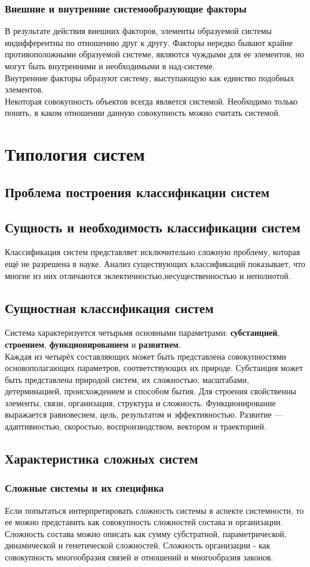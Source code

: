 \documentclass{article}
\newcommand{\important}[1]{\textbf{#1}}
\begin{document}
\subsubsection*{Внешние и внутренние системообразующие факторы}
В результате действия внешних факторов, элементы образуемой системы индифферентны по отношению друг к другу. Факторы нередко бывают крайне противоположными образуемой системе, являются чуждыми для ее элементов, но могут быть внутренними и необходимыми в над-системе.
\\
Внутренние факторы образуют систему, выступающую как единство подобных элементов.
\\
Некоторая совокупность объектов всегда является системой. Необходимо только понять, в каком отношении данную совокупность можно считать системой.
\section{Типология систем}
\subsection{Проблема построения классификации систем}
\subsection*{Сущность и необходимость классификации систем}
Классификация систем представляет исключительно сложную проблему, которая ещё не разрешена в науке. Анализ существующих классификаций показывает, что многие из них отличаются эклектичностью,несущественностью и неполнотой.
\subsection*{Сущностная классификация систем}
Система характеризуется четырьмя основными параметрами: \important{субстанцией}, \important{строением}, \important{функционированием} и \important{развитием}.
\\
Каждая из четырёх составляющих может быть представлена совокупностями основополагающих параметров, соответствующих их природе. Субстанция может быть представлена природой систем, их сложностью, масштабами, детерминацией, происхождением и способом бытия. Для строения свойственны элементы, связи, организация, структура и сложность. Функционирование выражается равновесием, цель, результатом и эффективностью. Развитие --- адаптивностью, скоростью, воспроизводством, вектором и траекторией.
\subsection{Характеристика сложных систем}
\subsubsection*{Сложные системы и их специфика}
Если попытаться интерпретировать сложность системы в аспекте системности, то ее можно представить как совокупность сложностей состава и организации. Сложность состава можно описать как сумму субстратной, параметрической, динамической и генетической сложностей. Сложность организации - как совокупность многообразия связей и отношений и многообразия законов.
\end{document}
